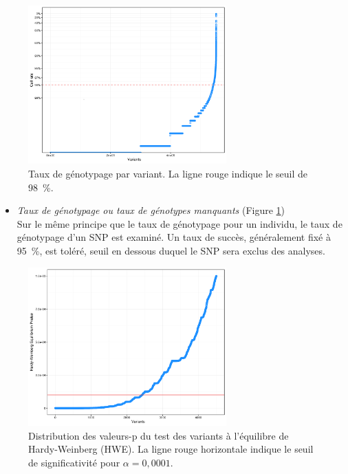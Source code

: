 \documentclass[11pt,a4paper,notrimn]{krantz}
\providecommand{\tightlist}{%
  \setlength{\itemsep}{0pt}\setlength{\parskip}{0pt}}
\theoremstyle{definition}
\theoremstyle{definition}
\theoremstyle{remark}
\begin{document}
\begin{figure}[!htb]

{\centering \includegraphics[width=3in,height=2.4in]{FiguresTables/variantbasedQC} 

}

\caption{Taux de génotypage par variant. La ligne rouge
indique le seuil de 98~\%.}\label{fig:variantbasedQC}
\end{figure}

\begin{itemize}
\tightlist
\item
  \emph{Taux de génotypage ou taux de génotypes manquants} (Figure
  \ref{fig:variantbasedQC})\\
  Sur le même principe que le taux de génotypage pour un individu, le
  taux de génotypage d'un SNP est examiné. Un taux de succès,
  généralement fixé à 95~\%, est toléré, seuil en dessous duquel le SNP
  sera exclus des analyses.
\end{itemize}





\begin{figure}[!htb]

{\centering \includegraphics[width=3in,height=2.4in]{FiguresTables/hardyweinbergpvalues} 

}

\caption{Distribution des valeurs-p du test des
variants à l'équilibre de Hardy-Weinberg (HWE). La ligne rouge
horizontale indique le seuil de significativité pour \(\alpha=0,0001\).}\label{fig:hardyweinbergpvalues}
\end{figure}
\end{document}
